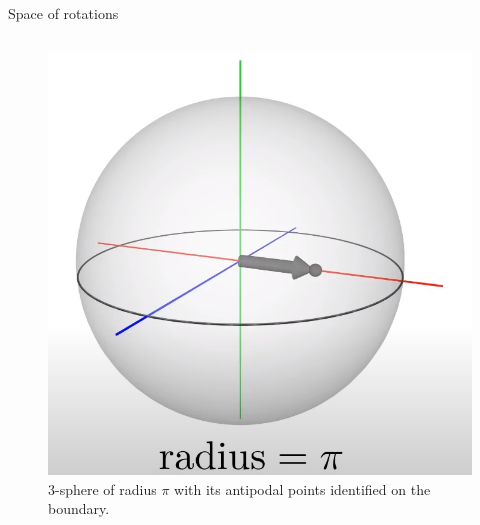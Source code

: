 \documentclass[9pt]{beamer}
\begin{document}
\begin{frame}{Space of rotations}
{\begin{columns}[T,onlytextwidth]
            \begin{figure}
                \centering
                \includegraphics[scale=0.1]{Pictures/SO3sphere.png}
                \caption{$3$-sphere of radius $\pi$ with its antipodal points identified on the boundary.}
            \end{figure}
  
    \end{columns}}
    
\end{frame}
\end{document}
